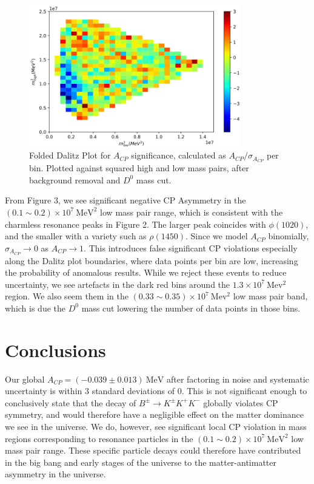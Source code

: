 \documentclass[11pt, twocolumn]{article}
\begin{document}
\begin{figure}[htp]
    \centering
    \includegraphics[width=9.2cm]{graph3.png}
    \caption{Folded Dalitz Plot for $A_{CP}$ significance, calculated as $A_{CP}/\sigma_{A_{CP}}$ per bin. Plotted against squared high and low mass pairs, after background removal and $D^0$ mass cut.}
\end{figure}
From Figure 3, we see significant negative CP Asymmetry in the $(0.1\sim0.2)\times 10^7 \ \mathrm{MeV^2}$ low mass pair range, which is consistent with the charmless resonance peaks in Figure 2. The larger peak coincides with $\phi(1020)$, and the smaller with a variety such as $\rho(1450)$. Since we model $A_{CP}$ binomially, ${\sigma_{A_{CP}}} \rightarrow 0$ as $A_{CP} \rightarrow 1$. This introduces false significant CP violations especially along the Dalitz plot boundaries, where data points per bin are low, increasing the probability of anomalous results. While we reject these events to reduce uncertainty, we see artefacts in the dark red bins around the $1.3 \times 10^7 \ \mathrm{Mev^2}$ region. We also seem them in the $(0.33\sim0.35) \times 10^7 \ \mathrm{Mev^2}$ low mass pair band, which is due the $D^0$ mass cut lowering the number of data points in those bins.

\section{Conclusions}
Our global $A_{CP} = (-0.039 \pm 0.013) \ \mathrm{MeV}$ after factoring in noise and systematic uncertainty is within 3 standard deviations of $0$. This is not significant enough to conclusively state that the decay of $B^{\pm} \rightarrow K^{\pm}K^{+}K^{-}$ globally violates CP symmetry, and would therefore have a negligible effect on the matter dominance we see in the universe. We do, however, see significant local CP violation in mass regions corresponding to resonance particles in the $(0.1\sim0.2)\times 10^7 \ \mathrm{MeV^2}$ low mass pair range. These specific particle decays could therefore have contributed in the big bang and early stages of the universe to the matter-antimatter asymmetry in the universe.

\printbibliography
\end{document}
